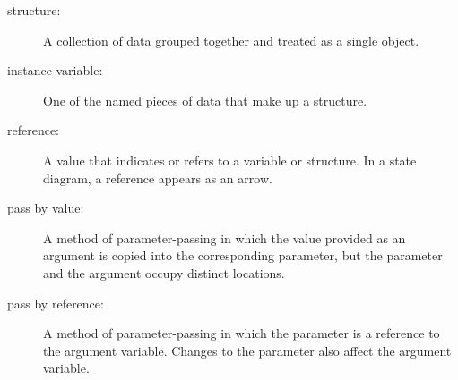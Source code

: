 \begin{description}

\item[structure:]  A collection of data grouped together and
treated as a single object.

\item[instance variable:]  One of the named pieces of data that make up
a structure.

\item[reference:]  A value that indicates or refers to a variable
or structure.  In a state diagram, a reference appears as an arrow.

\item[pass by value:]  A method of parameter-passing in which the
value provided as an argument is copied into the corresponding
parameter, but the parameter and the argument occupy distinct
locations.

\item[pass by reference:]  A method of parameter-passing in which
the parameter is a reference to the argument variable.  Changes
to the parameter also affect the argument variable.


\end{description}


